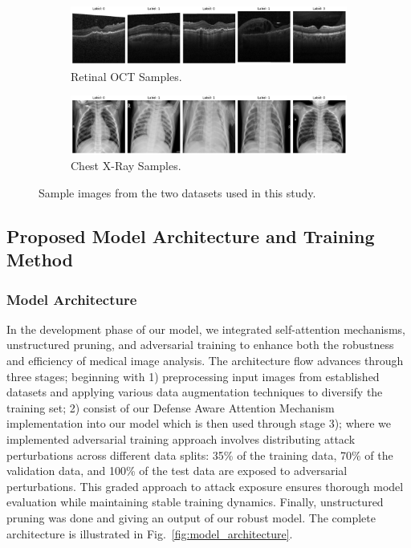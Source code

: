 \documentclass[preprint,12pt]{elsarticle}
\begin{document}
\begin{figure}[!t]
\centering
\begin{subfigure}[b]{\columnwidth}
\centering
\includegraphics[width=0.8\columnwidth]{fig/fig1_a.png}
\caption{Retinal OCT Samples.}
\end{subfigure}
\begin{subfigure}[b]{\columnwidth}
\centering
\includegraphics[width=0.8\columnwidth]{fig/fig1_b.png}
\caption{Chest X-Ray Samples.}
\end{subfigure}
\caption{Sample images from the two datasets used in this study.}
\label{fig:dataset_samples}
\end{figure}

\subsection{Proposed Model Architecture and Training Method}

\subsubsection{Model Architecture}
In the development phase of our model, we integrated self-attention mechanisms, unstructured pruning, and adversarial training to enhance both the robustness and efficiency of medical image analysis. The architecture flow advances through three stages; beginning with 1) preprocessing input images from established datasets and applying various data augmentation techniques to diversify the training set; 2) consist of our Defense Aware Attention Mechanism implementation into our model which is then used through stage 3); where we implemented adversarial training approach involves distributing attack perturbations across different data splits: 35\% of the training data, 70\% of the validation data, and 100\% of the test data are exposed to adversarial perturbations. This graded approach to attack exposure ensures thorough model evaluation while maintaining stable training dynamics. Finally, unstructured pruning was done and giving an output of our robust model. The complete architecture is illustrated in Fig.~\ref{fig:model_architecture}.
\end{document}
